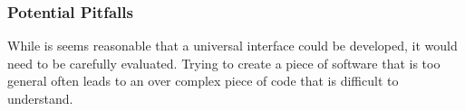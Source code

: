 \subsubsection{Potential Pitfalls}
While is seems reasonable that a universal interface could be developed, it would need to be carefully evaluated.  Trying to create a piece of software that is too general often leads to an over complex piece of code that is difficult to understand. 